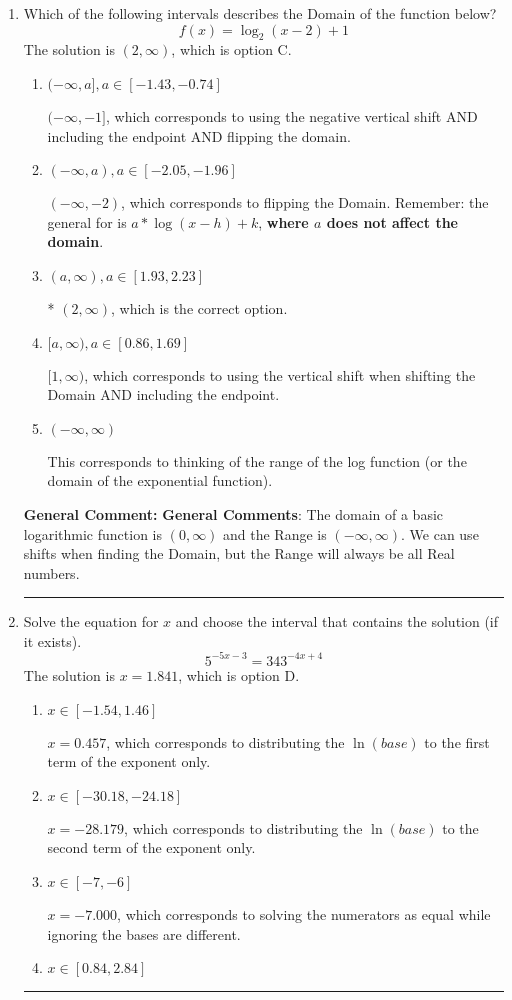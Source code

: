 \documentclass{extbook}[14pt]
\newcommand{\litem}[1]{\item #1

\rule{\textwidth}{0.4pt}}
\begin{document}
\begin{enumerate}\litem{
Which of the following intervals describes the Domain of the function below?
\[ f(x) = \log_2{(x-2)}+1 \]The solution is \( (2, \infty) \), which is option C.\begin{enumerate}[label=\Alph*.]
\item \( (-\infty, a], a \in [-1.43, -0.74] \)

$(-\infty, -1]$, which corresponds to using the negative vertical shift AND including the endpoint AND flipping the domain.
\item \( (-\infty, a), a \in [-2.05, -1.96] \)

$(-\infty, -2)$, which corresponds to flipping the Domain. Remember: the general for is $a*\log(x-h)+k$, \textbf{where $a$ does not affect the domain}.
\item \( (a, \infty), a \in [1.93, 2.23] \)

* $(2, \infty)$, which is the correct option.
\item \( [a, \infty), a \in [0.86, 1.69] \)

$[1, \infty)$, which corresponds to using the vertical shift when shifting the Domain AND including the endpoint.
\item \( (-\infty, \infty) \)

This corresponds to thinking of the range of the log function (or the domain of the exponential function).
\end{enumerate}

\textbf{General Comment:} \textbf{General Comments}: The domain of a basic logarithmic function is $(0, \infty)$ and the Range is $(-\infty, \infty)$. We can use shifts when finding the Domain, but the Range will always be all Real numbers.
}
\litem{
Solve the equation for $x$ and choose the interval that contains the solution (if it exists).
\[ 5^{-5x-3} = 343^{-4x+4} \]The solution is \( x = 1.841 \), which is option D.\begin{enumerate}[label=\Alph*.]
\item \( x \in [-1.54, 1.46] \)

$x = 0.457$, which corresponds to distributing the $\ln(base)$ to the first term of the exponent only.
\item \( x \in [-30.18, -24.18] \)

$x = -28.179$, which corresponds to distributing the $\ln(base)$ to the second term of the exponent only.
\item \( x \in [-7, -6] \)

$x = -7.000$, which corresponds to solving the numerators as equal while ignoring the bases are different.
\item \( x \in [0.84, 2.84] \)


\end{enumerate}}
\end{enumerate}
\end{document}
